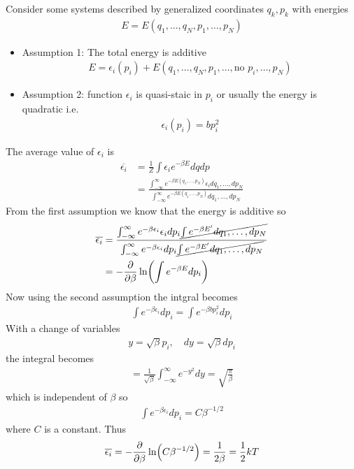 \documentclass[../main.tex]{subfiles}
\begin{document}
Consider some systems described by generalized coordinates $q_k, p_k$ with energies
\begin{align*}
    E = E(q_1, \dots, q_N, p_1, \dots, p_N)
\end{align*}
\begin{itemize}
    \item Assumption 1: The total energy is additive
    \begin{align*}
        E = \epsilon_i(p_i) + E(q_1, \dots, q_N, p_1, \dots, \text{no } p_i, \dots, p_N)
    \end{align*}
    \item Assumption 2: function $\epsilon_i$ is quasi-staic in $p_i$ or usually the energy is quadratic i.e.
    \begin{align*}
        \epsilon_i(p_i) = bp_i^2
    \end{align*}
\end{itemize}
The average value of $\epsilon_i$ is
\begin{align*}
    \overline{\epsilon_i} &= \frac{1}{Z} \int \epsilon_i e^{-\beta E} dq dp \\
    &= \frac{\int_{-\infty}^\infty e^{-\beta E(q_1,\dots, p_N)} \epsilon_i dq_1, \dots, dp_N}{\int_{-\infty}^\infty e^{-\beta E(q_1,\dots, p_N)} dq_1, \dots, dp_N}
\end{align*}
From the first assumption we know that the energy is additive so
\begin{align*}
    \overline{\epsilon_i} &= \frac{\int_{-\infty}^\infty e^{-\beta \epsilon_i} \epsilon_i dp_i \cancel{\int e^{-\beta E'} dq_1, \dots, dp_N}}{\int_{-\infty}^\infty e^{-\beta \epsilon_i} dp_i \cancel{\int e^{-\beta E'} dq_1, \dots, dp_N}} \\
    &= -\pdv{\beta} \ln(\int e^{-\beta E} dp_i)
\end{align*}
Now using the second assumption the intgral becomes
\begin{align*}
    \int e^{-\beta \epsilon_i} dp_i = \int e^{-\beta bp_i^2} dp_i
\end{align*}
With a change of variables
\begin{align*}
    y = \sqrt{\beta} p_i, \quad dy = \sqrt{\beta} dp_i
\end{align*}
the integral becomes
\begin{align*}
    = \frac{1}{\sqrt{\beta}} \int_{-\infty}^\infty e^{-y^2} dy = \sqrt{\frac{\pi}{\beta}}
\end{align*}
which is independent of $\beta$ so
\begin{align*}
    \int e^{-\beta \epsilon_i} dp_i = C \beta^{-1/2} 
\end{align*}
where $C$ is a constant. Thus
\begin{align*}
    \overline{\epsilon_i} = -\pdv{\beta} \ln(C \beta^{-1/2}) = \frac{1}{2\beta} = \frac{1}{2} kT
\end{align*}
\end{document}
